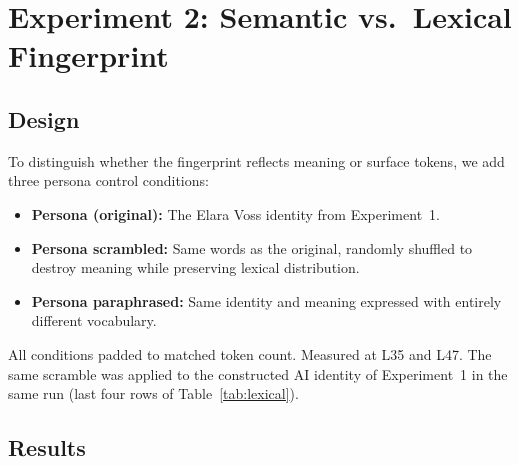 \documentclass[11pt,a4paper]{article}
\begin{document}
\section{Experiment 2: Semantic vs.\ Lexical Fingerprint}
\label{sec:lexical}

\subsection{Design}

To distinguish whether the fingerprint reflects meaning or surface tokens,
we add three persona control conditions:

\begin{itemize}[nosep]
  \item \textbf{Persona (original):} The Elara Voss identity from
    Experiment~1.
  \item \textbf{Persona scrambled:} Same words as the original, randomly
    shuffled to destroy meaning while preserving lexical distribution.
  \item \textbf{Persona paraphrased:} Same identity and meaning expressed
    with entirely different vocabulary.
\end{itemize}

All conditions padded to matched token count. Measured at L35 and L47.
The same scramble was applied to the constructed AI identity of
Experiment~1 in the same run (last four rows of Table~\ref{tab:lexical}).

\subsection{Results}
\end{document}
